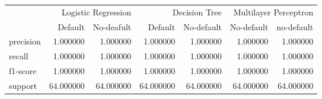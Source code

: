 \begin{table}
\thcenter
\begin{tabular}{lrrrrrr}
 & \multicolumn{2}{r}{Logistic Regression} & \multicolumn{2}{r}{Decision Tree  } & \multicolumn{2}{r}{Multilayer Perceptron} \\
 & Default & No-deafult & Default & No-default & No-default & no-default \\
precision & 1.000000 & 1.000000 & 1.000000 & 1.000000 & 1.000000 & 1.000000 \\
recall & 1.000000 & 1.000000 & 1.000000 & 1.000000 & 1.000000 & 1.000000 \\
f1-score & 1.000000 & 1.000000 & 1.000000 & 1.000000 & 1.000000 & 1.000000 \\
support & 64.000000 & 64.000000 & 64.000000 & 64.000000 & 64.000000 & 64.000000 \\
\end{tabular}
\end{table}
